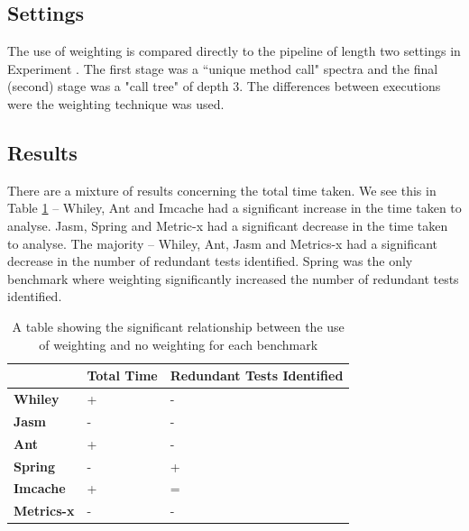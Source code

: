 \subsection{Settings}
The use of weighting is compared directly to the pipeline of length two settings in Experiment . The first stage was a ``unique method call" spectra and the final (second) stage was a "call tree" of depth 3. The differences between executions were the weighting technique was used.


\subsection{Results}
There are a mixture of results concerning the total time taken. We see this in Table \ref{weightingsig} -- Whiley, Ant and Imcache had a significant increase in the time taken to analyse. Jasm, Spring and Metric-x had a significant decrease in the time taken to analyse. The majority -- Whiley, Ant, Jasm and Metrics-x had a significant decrease in the number of redundant tests identified. Spring was the only benchmark where weighting significantly increased the number of redundant tests identified.

\begin{table}[h]
\centering


\begin{tabular}{|l|l|l|}
\hline
{\bf }          & {\bf Total Time} & {\bf Redundant Tests Identified} \\ \hline
{\bf Whiley}    & +                & -                           \\ \hline
{\bf Jasm}      & -                & -                           \\ \hline
{\bf Ant}       & +                & -                           \\ \hline
{\bf Spring}    & -                & +                           \\ \hline
{\bf Imcache}   & +                & =                           \\ \hline
{\bf Metrics-x} & -                & -                           \\ \hline
\end{tabular}
\caption{A table showing the significant relationship between the use of weighting and no weighting for each benchmark}
\label{weightingsig}
\end{table}



